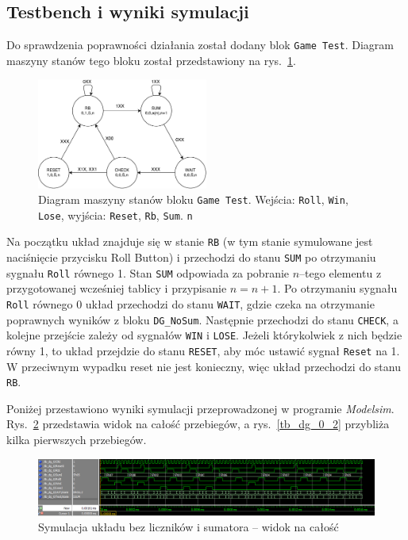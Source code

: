 \documentclass[a4paper,11pt,fleqn]{article}
\begin{document}
\subsection{Testbench i wyniki symulacji}

Do sprawdzenia poprawności działania został dodany blok \texttt{Game Test}. Diagram maszyny stanów tego bloku został przedstawiony na rys.~\ref{gameTestDiagram}.

\begin{figure}[h]
\centering
\includegraphics[width=0.5\textwidth]{diagrams/gameTestDiagram.pdf}
\caption{Diagram maszyny stanów bloku \texttt{Game Test}. Wejścia: \texttt{Roll}, \texttt{Win}, \texttt{Lose}, wyjścia: \texttt{Reset}, \texttt{Rb}, \texttt{Sum}. \texttt{n}}
\label{gameTestDiagram}
\end{figure}

Na początku układ znajduje się w stanie \texttt{RB} (w tym stanie symulowane jest naciśnięcie przycisku Roll Button) i przechodzi do stanu \texttt{SUM} po otrzymaniu sygnału \texttt{Roll} równego 1. Stan \texttt{SUM} odpowiada za pobranie $n$--tego elementu z przygotowanej wcześniej tablicy i przypisanie $n=n+1$. Po otrzymaniu sygnału \texttt{Roll} równego 0 układ przechodzi do stanu \texttt{WAIT}, gdzie czeka na otrzymanie poprawnych wyników z bloku \texttt{DG\_NoSum}. Następnie przechodzi do stanu \texttt{CHECK}, a kolejne przejście zależy od sygnałów \texttt{WIN} i \texttt{LOSE}. Jeżeli którykolwiek z nich będzie równy 1, to układ przejdzie do stanu \texttt{RESET}, aby móc ustawić sygnał \texttt{Reset} na 1. W przeciwnym wypadku reset nie jest konieczny, więc układ przechodzi do stanu \texttt{RB}.

Poniżej przestawiono wyniki symulacji przeprowadzonej w programie \textit{Modelsim}. Rys.~\ref{tb_dg_0_1} przedstawia widok na całość przebiegów, a rys.~\ref{tb_dg_0_2} przybliża kilka pierwszych przebiegów.

\begin{figure}[h]
\centering
\includegraphics[scale = 0.35]{screens/tb_dg_0_1.png}
\caption{Symulacja układu bez liczników i sumatora -- widok na całość}
\label{tb_dg_0_1}
\end{figure}
\end{document}
